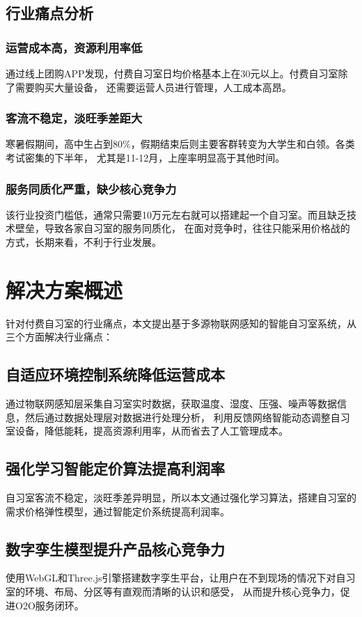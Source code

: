 \documentclass[12pt,a4paper]{IEEEtran} %
\begin{document}
\subsection{行业痛点分析}
\subsubsection{运营成本高，资源利用率低}
通过线上团购APP发现，付费自习室日均价格基本上在30元以上。付费自习室除了需要购买大量设备，
还需要运营人员进行管理，人工成本高昂。
\subsubsection{客流不稳定，淡旺季差距大}
寒暑假期间，高中生占到80\%，假期结束后则主要客群转变为大学生和白领。各类考试密集的下半年，
尤其是11-12月，上座率明显高于其他时间\cite{ZJTG202211023}。
\subsubsection{服务同质化严重，缺少核心竞争力}
该行业投资门槛低，通常只需要10万元左右就可以搭建起一个自习室。而且缺乏技术壁垒，导致各家自习室的服务同质化，
在面对竞争时，往往只能采用价格战的方式，长期来看，不利于行业发展。
\section{解决方案概述}
针对付费自习室的行业痛点，本文提出基于多源物联网感知的智能自习室系统，从三个方面解决行业痛点：
\subsection{自适应环境控制系统降低运营成本}
通过物联网感知层采集自习室实时数据，获取温度、湿度、压强、噪声等数据信息，然后通过数据处理层对数据进行处理分析，
利用反馈网络智能动态调整自习室设备，降低能耗，提高资源利用率，从而省去了人工管理成本。
\subsection{强化学习智能定价算法提高利润率}
自习室客流不稳定，淡旺季差异明显，所以本文通过强化学习算法，搭建自习室的需求价格弹性模型，通过智能定价系统提高利润率。
\subsection{数字孪生模型提升产品核心竞争力}
使用WebGL和Three.js引擎搭建数字孪生平台，让用户在不到现场的情况下对自习室的环境、布局、分区等有直观而清晰的认识和感受，
从而提升核心竞争力，促进O2O服务闭环。
\end{document}
